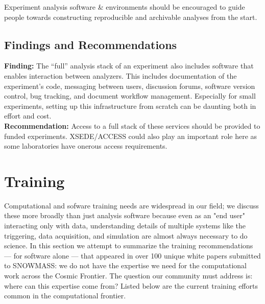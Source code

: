 Experiment analysis software \& environments should be encouraged to guide people towards constructing reproducible and archivable analyses from the start.

\subsection{Findings and Recommendations}
\textbf{Finding:} The “full” analysis stack of an experiment also includes software that enables interaction between analyzers. This includes documentation of the experiment's code, messaging between users, discussion forums, software version control, bug tracking, and document workflow management. Especially for small experiments, setting up this infrastructure from scratch can be daunting both in effort and cost.\\
\textbf{Recommendation:} Access to a full stack of these services should be provided to funded experiments.  XSEDE/ACCESS could also play an important role here as some laboratories have onerous access requirements.

\section{Training}\label{sec:training}

Computational and sofware training needs are widespread in our field; we discuss these more broadly than just analysis software because even as an "end user" interacting only with data, understanding details of multiple systems like the triggering, data acquisition, and simulation are almost always necessary to do science.  In this section we attempt to summarize the training recommendations --- for software alone --- that appeared in over 100 unique white papers submitted to SNOWMASS: we do not have the expertise we need for the computational work across the Cosmic Frontier.  The question our community must address is: where can this expertise come from?  Listed below are the current training efforts common in the computational frontier. 

